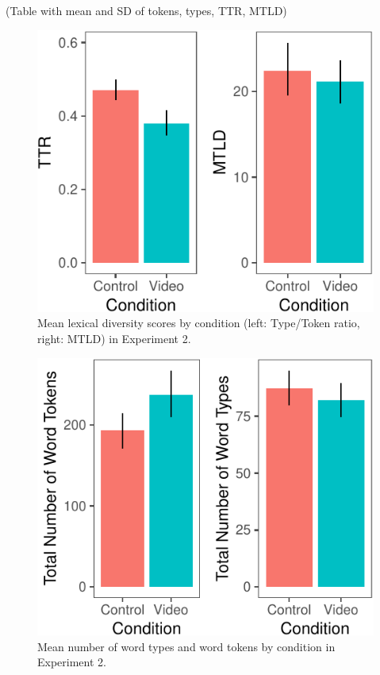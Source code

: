 \documentclass[]{article}
\begin{document}
(Table with mean and SD of tokens, types, TTR, MTLD)

\begin{figure}[H]

{\centering \includegraphics{figs/e2lexdiv-1} 

}

\caption{Mean lexical diversity scores by condition (left: Type/Token ratio, right: MTLD) in Experiment 2.}\label{fig:e2lexdiv}
\end{figure}

\begin{figure}[H]

{\centering \includegraphics{figs/e2token-type-1} 

}

\caption{Mean number of word types and word tokens by condition in Experiment 2.}\label{fig:e2token-type}
\end{figure}
\end{document}
